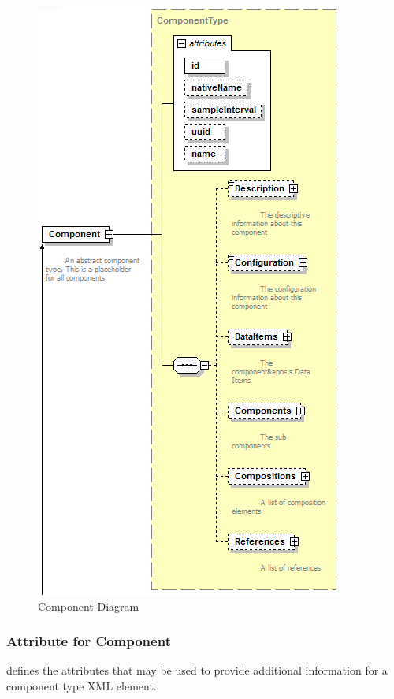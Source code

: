 \documentclass{mtconnect}	%
\begin{document}
\begin{figure}[ht]
  \centering
  \includegraphics[width=.5\textwidth]{figures/component-schema-diagram.png}
  \caption{Component Diagram}
  \label{fig:component-schema-diagram}
\end{figure}

\FloatBarrier

\subsubsection{Attribute for Component}

 defines the attributes that may be used to provide additional information for a \gls{component} type XML element.
\end{document}
